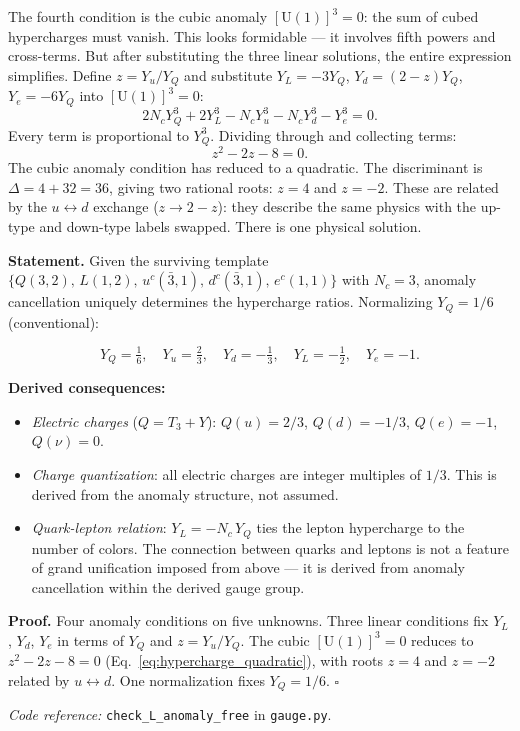 \documentclass[11pt]{article}
\newenvironment{varlist}{\begin{itemize}[nosep,leftmargin=2em]}{\end{itemize}}
\newcommand{\coderef}[2]{\smallskip\noindent\textit{Code reference:} \texttt{#1} in \texttt{#2}.}
\newcommand{\U}{\mathrm{U}}
\begin{document}
The fourth condition is the cubic anomaly $[\U(1)]^3 = 0$: the sum of cubed hypercharges must vanish.  This looks formidable --- it involves fifth powers and cross-terms.  But after substituting the three linear solutions, the entire expression simplifies.  Define $z = Y_u / Y_Q$ and substitute $Y_L = -3Y_Q$, $Y_d = (2-z)Y_Q$, $Y_e = -6Y_Q$ into $[\U(1)]^3 = 0$:
\begin{equation}
2 N_c Y_Q^3 + 2 Y_L^3 - N_c Y_u^3 - N_c Y_d^3 - Y_e^3 = 0.
\end{equation}
Every term is proportional to $Y_Q^3$.  Dividing through and collecting terms:
\begin{equation}
z^2 - 2z - 8 = 0.
\label{eq:hypercharge_quadratic}
\end{equation}
The cubic anomaly condition has reduced to a quadratic.  The discriminant is $\Delta = 4 + 32 = 36$, giving two rational roots: $z = 4$ and $z = -2$.  These are related by the $u \leftrightarrow d$ exchange ($z \to 2 - z$): they describe the same physics with the up-type and down-type labels swapped.  There is one physical solution.

\begin{tcolorbox}[apfbox, title={$L_{\mathrm{hypercharge}}$ (Unique Hypercharge Assignment)}]
\textbf{Statement.}  Given the surviving template $\{Q(3,2),\, L(1,2),\, u^c(\bar{3},1),\, d^c(\bar{3},1),\, e^c(1,1)\}$ with $N_c = 3$, anomaly cancellation uniquely determines the hypercharge ratios.  Normalizing $Y_Q = 1/6$ (conventional):

\begin{equation}
Y_Q = \tfrac{1}{6}, \quad Y_u = \tfrac{2}{3}, \quad Y_d = -\tfrac{1}{3}, \quad Y_L = -\tfrac{1}{2}, \quad Y_e = -1.
\label{eq:hypercharges}
\end{equation}

\smallskip\noindent\textbf{Derived consequences:}
\begin{varlist}
\item \textit{Electric charges} ($Q = T_3 + Y$): $Q(u) = 2/3$, $Q(d) = -1/3$, $Q(e) = -1$, $Q(\nu) = 0$.
\item \textit{Charge quantization}: all electric charges are integer multiples of $1/3$.  This is derived from the anomaly structure, not assumed.
\item \textit{Quark-lepton relation}: $Y_L = -N_c \, Y_Q$ ties the lepton hypercharge to the number of colors.  The connection between quarks and leptons is not a feature of grand unification imposed from above --- it is derived from anomaly cancellation within the derived gauge group.
\end{varlist}

\smallskip\noindent\textbf{Proof.}  Four anomaly conditions on five unknowns.  Three linear conditions fix $Y_L$, $Y_d$, $Y_e$ in terms of $Y_Q$ and $z = Y_u/Y_Q$.  The cubic $[\U(1)]^3 = 0$ reduces to $z^2 - 2z - 8 = 0$ (Eq.~\ref{eq:hypercharge_quadratic}), with roots $z = 4$ and $z = -2$ related by $u \leftrightarrow d$.  One normalization fixes $Y_Q = 1/6$.  $\square$

\coderef{check\_L\_anomaly\_free}{gauge.py}
\end{tcolorbox}
\end{document}
